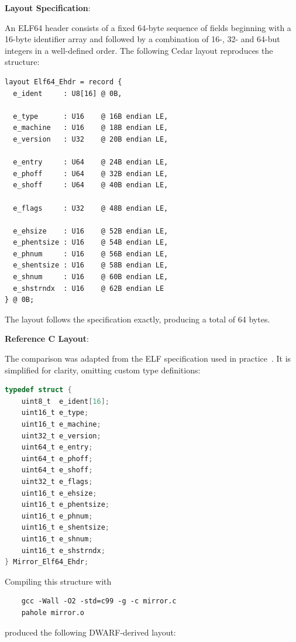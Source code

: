 \textbf{Layout Specification}:

An ELF64 header consists of a fixed 64-byte sequence of fields beginning
with a 16-byte identifier array and followed by a combination of 16-,
32- and 64-but integers in a well-defined order.
The following Cedar layout reproduces the structure:

\begin{verbatim}
layout Elf64_Ehdr = record {
  e_ident     : U8[16] @ 0B,

  e_type      : U16    @ 16B endian LE,
  e_machine   : U16    @ 18B endian LE,
  e_version   : U32    @ 20B endian LE,

  e_entry     : U64    @ 24B endian LE,
  e_phoff     : U64    @ 32B endian LE,
  e_shoff     : U64    @ 40B endian LE,

  e_flags     : U32    @ 48B endian LE,

  e_ehsize    : U16    @ 52B endian LE,
  e_phentsize : U16    @ 54B endian LE,
  e_phnum     : U16    @ 56B endian LE,
  e_shentsize : U16    @ 58B endian LE,
  e_shnum     : U16    @ 60B endian LE,
  e_shstrndx  : U16    @ 62B endian LE
} @ 0B;
\end{verbatim}

The layout follows the specification exactly, producing a total of 64 bytes.

\textbf{Reference C Layout}:

The comparison was adapted from the ELF specification used in practice~\cite{elf_spec}.
It is simplified for clarity, omitting custom type definitions:

\begin{lstlisting}[language=C, caption={Reference C structure for the ELF64 header}, label=lst:elf64hdr_c]
    typedef struct {
    uint8_t  e_ident[16];
    uint16_t e_type;
    uint16_t e_machine;
    uint32_t e_version;
    uint64_t e_entry;
    uint64_t e_phoff;
    uint64_t e_shoff;
    uint32_t e_flags;
    uint16_t e_ehsize;
    uint16_t e_phentsize;
    uint16_t e_phnum;
    uint16_t e_shentsize;
    uint16_t e_shnum;
    uint16_t e_shstrndx;
} Mirror_Elf64_Ehdr;
\end{lstlisting}

Compiling this structure with

\begin{verbatim}
    gcc -Wall -O2 -std=c99 -g -c mirror.c
    pahole mirror.o
\end{verbatim}

produced the following DWARF-derived layout:

